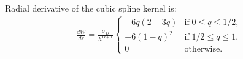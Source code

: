 \documentclass{article}
\begin{document}
Radial derivative of the cubic spline kernel is:
\begin{align}
 \frac{dW}{dr} = \frac{\sigma_D}{h^{D+1}} 
  \begin{cases}
   -6q(2 - 3q)  & \text{if} \; 0 \leq q \leq 1/2, \\
   -6(1 - q)^2  & \text{if} \; 1/2 \leq q \leq 1, \\
    0           & \text{otherwise}.
\end{cases}
\end{align}

\end{document}
